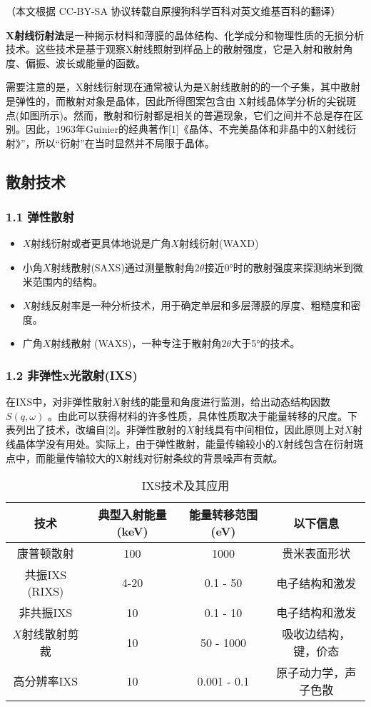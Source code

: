 
（本文根据 CC-BY-SA 协议转载自原搜狗科学百科对英文维基百科的翻译）

\textbf{X射线衍射法}是一种揭示材料和薄膜的晶体结构、化学成分和物理性质的无损分析技术。这些技术是基于观察X射线照射到样品上的散射强度，它是入射和散射角度、偏振、波长或能量的函数。

需要注意的是，X射线衍射现在通常被认为是X射线散射的的一个子集，其中散射是弹性的，而散射对象是晶体，因此所得图案包含由 X射线晶体学分析的尖锐斑点(如图所示)。然而，散射和衍射都是相关的普遍现象，它们之间并不总是存在区别。因此，1963年Guinier的经典著作[1]《晶体、不完美晶体和非晶中的X射线衍射》”，所以“衍射”在当时显然并不局限于晶体。

\subsection{散射技术}
\subsubsection{1.1 弹性散射}
\begin{itemize}
\item $X$射线衍射或者更具体地说是广角$X$射线衍射(WAXD)
\item 小角$X$射线散射(SAXS)通过测量散射角$2\theta$接近0°时的散射强度来探测纳米到微米范围内的结构。
\item $X$射线反射率是一种分析技术，用于确定单层和多层薄膜的厚度、粗糙度和密度。
\item 广角$X$射线散射 (WAXS)，一种专注于散射角$2\theta$大于5°的技术。
\end{itemize}
\subsubsection{1.2 非弹性x光散射(IXS)}
在IXS中，对非弹性散射$X$射线的能量和角度进行监测，给出动态结构因数 $S(q, \omega)$ 。由此可以获得材料的许多性质，具体性质取决于能量转移的尺度。下表列出了技术，改编自[2]。非弹性散射的$X$射线具有中间相位，因此原则上对$X$射线晶体学没有用处。实际上，由于弹性散射，能量传输较小的$X$射线包含在衍射斑点中，而能量传输较大的X射线对衍射条纹的背景噪声有贡献。

\begin{table}[h]
    \centering
      \caption{IXS技术及其应用}\begin{tabular}{|c|c|c|c|}
        \hline
        \textbf{技术} & \textbf{典型入射能量 (keV)} & \textbf{能量转移范围 (eV)} & \textbf{以下信息} \\
        \hline
        康普顿散射 & 100 & 1000 & 贵米表面形状 \\
        \hline
        共振IXS (RIXS) & 4-20 & 0.1 - 50 & 电子结构和激发 \\
        \hline
        非共振IXS & 10 & 0.1 - 10 & 电子结构和激发 \\
        \hline
        $X$射线散射剪裁 & 10 & 50 - 1000 & 吸收边结构，键，价态 \\
        \hline
        高分辨率IXS & 10 & 0.001 - 0.1 & 原子动力学，声子色散 \\
        \hline
    \end{tabular}
     \end{table}

